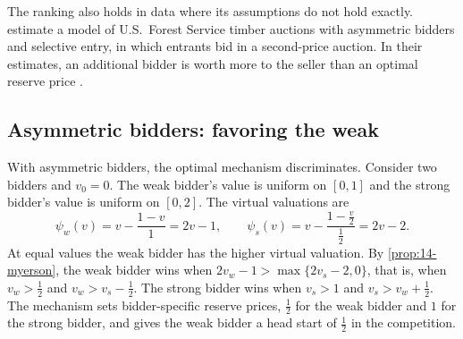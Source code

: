 The ranking also holds in data where its assumptions do not hold exactly.  estimate a model of U.S.\ Forest Service timber auctions with asymmetric bidders and selective entry, in which entrants bid in a second-price auction. In their estimates, an additional bidder is worth more to the seller than an optimal reserve price \citep[Section~2.2, p.~92]{HortacsuPerrigne2021}.

\subsection{Asymmetric bidders: favoring the weak}\label{sec:14-optimal-asym}

With asymmetric bidders, the optimal mechanism discriminates. Consider two bidders and $v_0=0$. The weak bidder's value is uniform on $[0,1]$ and the strong bidder's value is uniform on $[0,2]$. The virtual valuations are
\[
\psi_w(v)=v-\frac{1-v}{1}=2v-1,\qquad \psi_s(v)=v-\frac{1-\frac{v}{2}}{\frac12}=2v-2.
\]
At equal values the weak bidder has the higher virtual valuation. By \cref{prop:14-myerson}, the weak bidder wins when $2v_w-1>\max\{2v_s-2,0\}$, that is, when $v_w>\frac12$ and $v_w>v_s-\frac12$. The strong bidder wins when $v_s>1$ and $v_s>v_w+\frac12$. The mechanism sets bidder-specific reserve prices, $\frac12$ for the weak bidder and $1$ for the strong bidder, and gives the weak bidder a head start of $\frac12$ in the competition.

